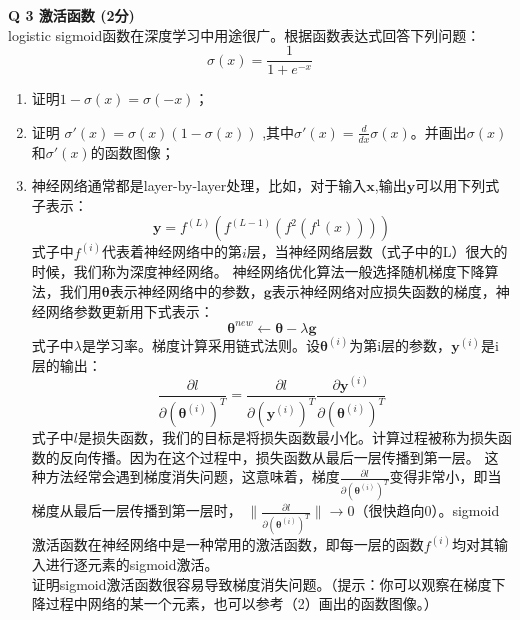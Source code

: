 \documentclass[a4paper, 11pt]{article}
\newenvironment{problem}[2][Q]
    { \begin{mdframed}[backgroundcolor=gray!20] \textbf{#1 #2} \\}
    {  \end{mdframed}}
\begin{document}
\begin{CJK}{UTF8}{gbsn}
\begin{problem}{3 激活函数 (2分)}
logistic sigmoid函数在深度学习中用途很广。根据函数表达式回答下列问题：
\begin{equation}
    \sigma(x)=\frac{1}{1+e^{-x}}
\end{equation}
\begin{enumerate}
\item 证明$1-\sigma(x)=\sigma(-x)$；\\
\item 证明 $\sigma'(x)=\sigma(x)(1-\sigma(x))$ ,其中$\sigma'(x)=\frac{d}{dx}\sigma(x)$。并画出$\sigma(x)$和$\sigma'(x)$的函数图像；\\
\item 神经网络通常都是layer-by-layer处理，比如，对于输入$\bm{x}$,输出$\bm{y}$可以用下列式子表示：
\begin{equation}
    \bm{y}=f^{(L)}(f^{(L-1)}(f^{2}(f^{1}(x))))
\end{equation}
式子中$f^{(i)}$代表着神经网络中的第$i$层，当神经网络层数（式子中的L）很大的时候，我们称为深度神经网络。
神经网络优化算法一般选择随机梯度下降算法，我们用$\bm{\theta}$表示神经网络中的参数，$\bm{g}$表示神经网络对应损失函数的梯度，神经网络参数更新用下式表示：
\begin{equation}
    \bm{\theta}^{new}\leftarrow \bm{\theta}-\lambda \bm{g}
\end{equation}
式子中$\lambda$是学习率。梯度计算采用链式法则。设$\bm{\theta}^{(i)}$为第i层的参数，$\bm{y}^{(i)}$是i层的输出：
\begin{equation}
    \frac{\partial l}{\partial(\bm{\theta}^{(i)})^{T}}
    =\frac{\partial l}{\partial(\bm{y}^{(i)})^{T}} 
    \frac{\partial \bm{y}^{(i)}}{\partial(\bm{\theta}^{(i)})^{T}}
\end{equation}
式子中$l$是损失函数，我们的目标是将损失函数最小化。计算过程被称为损失函数的反向传播。因为在这个过程中，损失函数从最后一层传播到第一层。
这种方法经常会遇到梯度消失问题，这意味着，梯度$ \frac{\partial l}{\partial(\bm{\theta}^{(i)})^{T}}$变得非常小，即当梯度从最后一层传播到第一层时， $\|\frac{\partial l}{\partial(\bm{\theta}^{(i)})^{T}}\|\rightarrow 0$（很快趋向0）。sigmoid激活函数在神经网络中是一种常用的激活函数，即每一层的函数$f^{(i)}$均对其输入进行逐元素的sigmoid激活。 \\
证明sigmoid激活函数很容易导致梯度消失问题。（提示：你可以观察在梯度下降过程中网络的某一个元素，也可以参考（2）画出的函数图像。）
\end{enumerate}
\end{problem}





\end{CJK}
\end{document}
